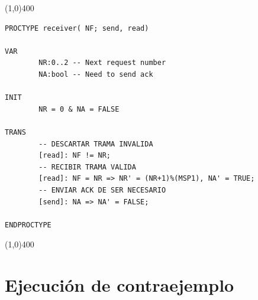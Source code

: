 \documentclass[titlepage, 12pt]{book}
\begin{document}
\noindent \line(1,0){400}
\begin{verbatim}
PROCTYPE receiver( NF; send, read)

VAR
        NR:0..2 -- Next request number
        NA:bool -- Need to send ack

INIT
        NR = 0 & NA = FALSE

TRANS
        -- DESCARTAR TRAMA INVALIDA
        [read]: NF != NR;
        -- RECIBIR TRAMA VALIDA
        [read]: NF = NR => NR' = (NR+1)%(MSP1), NA' = TRUE;
        -- ENVIAR ACK DE SER NECESARIO
        [send]: NA => NA' = FALSE;

ENDPROCTYPE
\end{verbatim}
\noindent \line(1,0){400}

\section*{Ejecuci\'on de contraejemplo}
\end{document}
